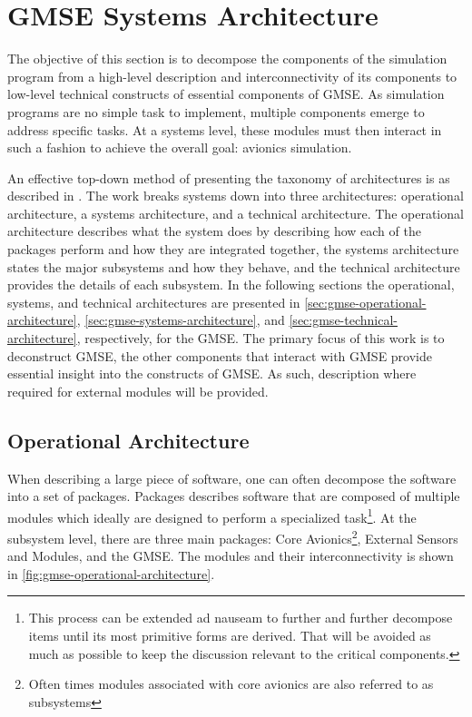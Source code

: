 \section{GMSE Systems Architecture}

The objective of this section is to decompose the components of the simulation program from a
high-level description and interconnectivity of its components to low-level technical constructs of
essential components of GMSE. As simulation programs are no simple task to implement, multiple
components emerge to address specific tasks. At a systems level, these modules must then interact in
such a fashion to achieve the overall goal: avionics simulation.

An effective top-down method of presenting the taxonomy of architectures is as described in
\cite{levis_c4isr_2000}. The work breaks systems down into three architectures: operational
architecture, a systems architecture, and a technical architecture. The operational architecture
describes what the system does by describing how each of the packages perform and how they are
integrated together, the systems architecture states the major subsystems and how they behave, and
the technical architecture provides the details of each subsystem. In the following sections the
operational, systems, and technical architectures are presented in
\autoref{sec:gmse-operational-architecture}, \autoref{sec:gmse-systems-architecture}, and
\autoref{sec:gmse-technical-architecture}, respectively, for the GMSE. The primary focus of this
work is
to deconstruct GMSE, the other components that interact with GMSE provide essential insight into the
constructs of GMSE. As such, description where required for external modules will be provided.

\subsection{Operational Architecture}
\label{sec:gmse-operational-architecture}

When describing a large piece of software, one can often decompose the software into a set of
packages. Packages describes software that are composed of multiple modules which ideally are
designed to perform a specialized task\footnote{This process can be extended ad nauseam to further
and further decompose items until its most primitive forms are derived. That will be avoided as much
as possible to keep the discussion relevant to the critical components.}. At the subsystem level,
there are three main packages: Core Avionics\footnote{Often times modules associated with core
avionics are also referred to as subsystems}, External Sensors and Modules, and the GMSE. The
modules and their interconnectivity is shown in \autoref{fig:gmse-operational-architecture}.

